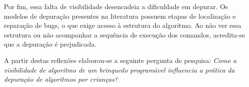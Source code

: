 Por fim, essa falta de visibilidade desencadeia a dificuldade em depurar. Os modelos de depuração presentes na literatura \cite{carver_assessing_1986, mccauley_debugging_2008} possuem etapas de localização e reparação de bugs, o que exige acesso à estrutura do algoritmo. Ao não ver essa estrutura ou não acompanhar a sequência de execução dos comandos, acredita-se que a depuração é prejudicada.

A partir destas reflexões elaborou-se a seguinte pergunta de pesquisa:
\textit{Como a visibilidade de algoritmo de um brinquedo programável influencia a prática da depuração de algoritmos por crianças?}








